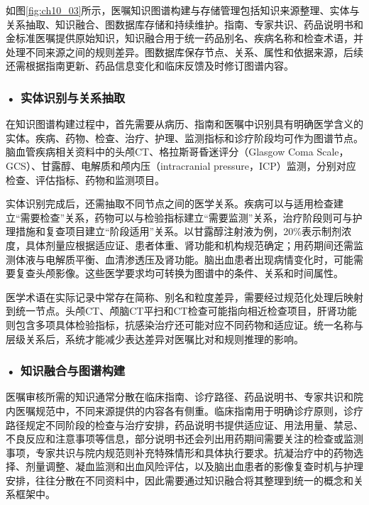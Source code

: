 如图\ref{fig:ch10_03}所示，医嘱知识图谱构建与存储管理包括知识来源整理、实体与关系抽取、知识融合、图数据库存储和持续维护。指南、专家共识、药品说明书和金标准医嘱提供原始知识，知识融合用于统一药品别名、疾病名称和检查术语，并处理不同来源之间的规则差异。图数据库保存节点、关系、属性和依据来源，后续还需根据指南更新、药品信息变化和临床反馈及时修订图谱内容。


\par
\noindent\begin{minipage}{\textwidth}
\centering
{}
\label{fig:ch10_03}
\end{minipage}
\par
\subsubsection*{\textbf{• 实体识别与关系抽取}}

在知识图谱构建过程中，首先需要从病历、指南和医嘱中识别具有明确医学含义的实体。疾病、药物、检查、治疗、护理、监测指标和诊疗阶段均可作为图谱节点。脑血管疾病相关资料中的头颅CT、格拉斯哥昏迷评分（Glasgow Coma Scale，GCS）、甘露醇、电解质和颅内压（intracranial pressure，ICP）监测，分别对应检查、评估指标、药物和监测项目。

实体识别完成后，还需抽取不同节点之间的医学关系。疾病可以与适用检查建立“需要检查”关系，药物可以与检验指标建立“需要监测”关系，治疗阶段则可与护理措施和复查项目建立“阶段适用”关系。以甘露醇注射液为例，20\%表示制剂浓度，具体剂量应根据适应证、患者体重、肾功能和机构规范确定；用药期间还需监测体液与电解质平衡、血清渗透压及肾功能。脑出血患者出现病情变化时，可能需要复查头颅影像。这些医学要求均可转换为图谱中的条件、关系和时间属性。

医学术语在实际记录中常存在简称、别名和粒度差异，需要经过规范化处理后映射到统一节点。头颅CT、颅脑CT平扫和CT检查可能指向相近检查项目，肝肾功能则包含多项具体检验指标，抗感染治疗还可能对应不同药物和适应证。统一名称与层级关系后，系统才能减少表达差异对医嘱比对和规则推理的影响。


\subsubsection*{\textbf{• 知识融合与图谱构建}}
医嘱审核所需的知识通常分散在临床指南、诊疗路径、药品说明书、专家共识和院内医嘱规范中，不同来源提供的内容各有侧重。临床指南用于明确诊疗原则，诊疗路径规定不同阶段的检查与治疗安排，药品说明书提供适应证、用法用量、禁忌、不良反应和注意事项等信息，部分说明书还会列出用药期间需要关注的检查或监测事项，专家共识与院内规范则补充特殊情形和具体执行要求。抗凝治疗中的药物选择、剂量调整、凝血监测和出血风险评估，以及脑出血患者的影像复查时机与护理安排，往往分散在不同资料中，因此需要通过知识融合将其整理到统一的概念和关系框架中。

